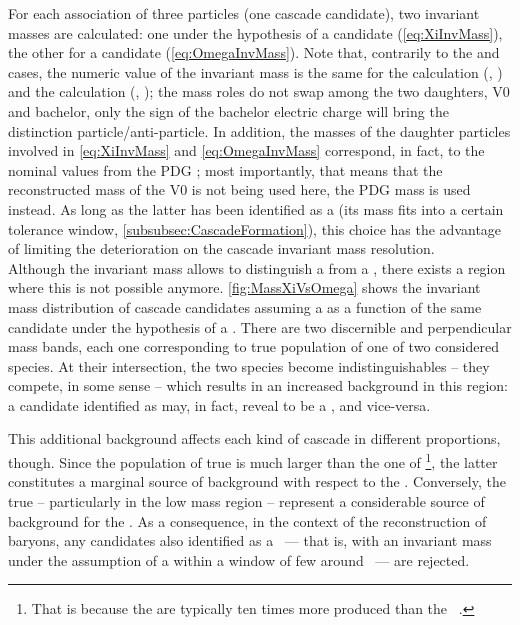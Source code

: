 For each association of three particles (\ie one cascade candidate), two invariant masses are calculated: one under the hypothesis of a \rmXiPM candidate (\eq\ref{eq:XiInvMass}), the other for a \rmOmegaPM candidate (\eq\ref{eq:OmegaInvMass}). Note that, contrarily to the \rmLambda and \rmAlambda cases, the numeric value of the invariant mass is the same for the  calculation (\rmXiM, \rmOmegaM) and the  calculation (\rmAxiP, \rmAomegaP);
the mass roles do not swap among the two daughters, V0 and bachelor, only the sign of the bachelor electric charge will bring the distinction particle/anti-particle.
In addition, the masses of the daughter particles involved in \eq\ref{eq:XiInvMass} and \ref{eq:OmegaInvMass} correspond, in fact, to the nominal values from the PDG \cite{particledatagroupReviewParticlePhysics2022}; most importantly, that means that the reconstructed mass of the V0 is not being used here, \ie the PDG mass \mPDG[\rmLambda] is used instead. As long as the latter has been identified as a \rmLambdaPM (\ie its mass fits into a certain tolerance window, \Sec\ref{subsubsec:CascadeFormation}), this choice has the advantage of limiting the deterioration on the cascade invariant mass resolution. \\

Although the invariant mass allows to distinguish a \rmXiPM from a \rmOmegaPM, there exists a region where this is not possible anymore. \Fig\ref{fig:MassXiVsOmega} shows the invariant mass distribution of cascade candidates assuming a \rmOmegaM as a function of the same candidate under the hypothesis of a \rmXiM. There are two discernible and perpendicular mass bands, each one corresponding to true population of one of two considered species. At their intersection, the two species become indistinguishables -- they compete, in some sense -- which results in an increased background in this region: a candidate identified as \rmXiM may, in fact, reveal to be a \rmOmegaM, and vice-versa.

This additional background affects each kind of cascade in different proportions, though. Since the population of true \rmXiM is much larger than the one of \rmOmegaM\footnote{That is because the \rmXi are typically ten times more produced than the \rmOmega~\cite{alicecollaborationProductionLightflavorHadrons2021}.}, the latter constitutes a marginal source of background with respect to the \rmXiM. Conversely, the true \rmXiM -- particularly in the low mass region -- represent a considerable source of background for the \rmOmegaM. As a consequence, in the context of the reconstruction of \rmOmegaPM baryons, any candidates also identified as a \rmXiPM\ --- that is, with an invariant mass under the assumption of a \rmXiPM within a window of few \mmass around \mPDG[\rmXi]\ --- are rejected.

